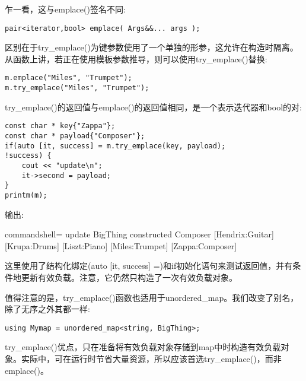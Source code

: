乍一看，这与emplace()签名不同:

\begin{lstlisting}[style=styleCXX]
pair<iterator,bool> emplace( Args&&... args );
\end{lstlisting}

区别在于try\_emplace()为键参数使用了一个单独的形参，这允许在构造时隔离。从函数上讲，若正在使用模板参数推导，则可以使用try\_emplace()替换:

\begin{lstlisting}[style=styleCXX]
m.emplace("Miles", "Trumpet");
m.try_emplace("Miles", "Trumpet");
\end{lstlisting}

try\_emplace()的返回值与emplace()的返回值相同，是一个表示迭代器和bool的对:

\begin{lstlisting}[style=styleCXX]
const char * key{"Zappa"};
const char * payload{"Composer"};
if(auto [it, success] = m.try_emplace(key, payload);
!success) {
	cout << "update\n";
	it->second = payload;
}
printm(m);
\end{lstlisting}

输出:

\begin{tcblisting}{commandshell={}}
update
BigThing constructed Composer
[Hendrix:Guitar] [Krupa:Drums] [Liszt:Piano] [Miles:Trumpet]
[Zappa:Composer]
\end{tcblisting}

这里使用了结构化绑定(auto [it, success] =)和if初始化语句来测试返回值，并有条件地更新有效负载。注意，它仍然只构造了一次有效负载对象。

值得注意的是，try\_emplace()函数也适用于unordered\_map。我们改变了别名，除了无序之外其都一样:

\begin{lstlisting}[style=styleCXX]
using Mymap = unordered_map<string, BigThing>;
\end{lstlisting}

try\_emplace()优点，只在准备将有效负载对象存储到map中时构造有效负载对象。实际中，可在运行时节省大量资源，所以应该首选try\_emplace()，而非emplace()。




















